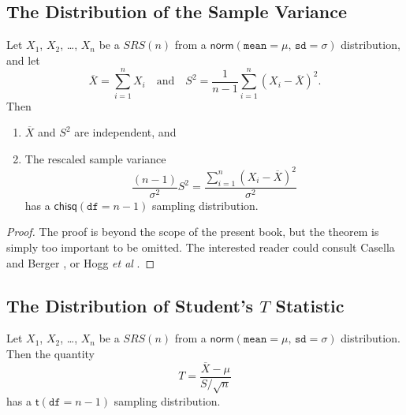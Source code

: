 \documentclass[captions=tableheading]{scrbook}
\begin{document}
\subsection{The Distribution of the Sample Variance}
\label{sec-8-2-2}
\label{sub-Samp-Var-Dist}


\begin{thm}
Let \(X_{1}\), \(X_{2}\), \ldots{}, \(X_{n}\) be a \(SRS(n)\) from a \(\mathsf{norm}(\mathtt{mean}=\mu,\,\mathtt{sd}=\sigma)\) distribution, and let
\begin{equation}
\overline{X}=\sum_{i=1}^{n}X_{i}\quad \mbox{and}\quad S^{2}=\frac{1}{n-1}\sum_{i=1}^{n}(X_{i}-\overline{X})^{2}.
\end{equation}
Then
\begin{enumerate}
\item \(\overline{X}\) and \(S^{2}\) are independent, and
\item The rescaled sample variance
    \begin{equation}
    \frac{(n-1)}{\sigma^{2}}S^{2}=\frac{\sum_{i=1}^{n}(X_{i}-\overline{X})^{2}}{\sigma^{2}}
    \end{equation}
    has a \(\mathsf{chisq}(\mathtt{df}=n-1)\) sampling distribution.
\end{enumerate}

\end{thm}

\begin{proof}
The proof is beyond the scope of the present book, but the theorem is simply too important to be omitted. The interested reader could consult Casella and Berger \cite{Casella2002}, or Hogg \emph{et al} \cite{Hogg2005}. 
\end{proof}
\subsection{The Distribution of Student's \(T\) Statistic}
\label{sec-8-2-3}
\label{sub-Student's-t-Distribution}


\begin{prop}
Let \(X_{1}\), \(X_{2}\), \ldots{}, \(X_{n}\) be a \(SRS(n)\) from a \(\mathsf{norm}(\mathtt{mean}=\mu,\,\mathtt{sd}=\sigma)\) distribution. Then the quantity 
\begin{equation}
T=\frac{\overline{X}-\mu}{S/\sqrt{n}}
\end{equation}
has a \(\mathsf{t}(\mathtt{df}=n-1)\) sampling distribution.
\end{prop}
\end{document}

